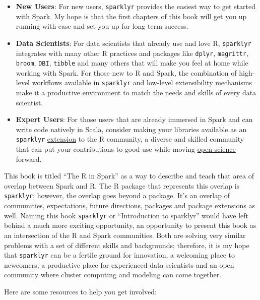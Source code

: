 \documentclass[]{book}
\providecommand{\tightlist}{%
  \setlength{\itemsep}{0pt}\setlength{\parskip}{0pt}}
\theoremstyle{definition}
\theoremstyle{definition}
\theoremstyle{definition}
\theoremstyle{remark}
\begin{document}
\begin{itemize}
\tightlist
\item
  \textbf{New Users}: For new users, \texttt{sparklyr} provides the
  easiest way to get started with Spark. My hope is that the first
  chapters of this book will get you up running with ease and set you up
  for long term success.
\item
  \textbf{Data Scientists}: For data scientists that already use and
  love R, \texttt{sparklyr} integrates with many other R practices and
  packages like \texttt{dplyr}, \texttt{magrittr}, \texttt{broom},
  \texttt{DBI}, \texttt{tibble} and many others that will make you feel
  at home while working with Spark. For those new to R and Spark, the
  combination of high-level workflows available in \texttt{sparklyr} and
  low-level extensibility mechanisms make it a productive environment to
  match the needs and skills of every data scientist.
\item
  \textbf{Expert Users}: For those users that are already immersed in
  Spark and can write code natively in Scala, consider making your
  libraries available as an \texttt{sparklyr}
  \protect\hyperlink{writting-extensions}{extension} to the R community,
  a diverse and skilled community that can put your contributions to
  good use while moving
  \href{https://en.wikipedia.org/wiki/Open_science}{open science}
  forward.
\end{itemize}

This book is titled ``The R in Spark'' as a way to describe and teach
that area of overlap between Spark and R. The R package that represents
this overlap is \texttt{sparklyr}; however, the overlap goes beyond a
package. It's an overlap of communities, expectations, future
directions, packages and package extensions as well. Naming this book
\texttt{sparklyr} or ``Introduction to sparklyr'' would have left behind
a much more exciting opportunity, an opportunity to present this book as
an intersection of the R and Spark communities. Both are solving very
similar problems with a set of different skills and backgrounds;
therefore, it is my hope that \texttt{sparklyr} can be a fertile ground
for innovation, a welcoming place to newcomers, a productive place for
experienced data scientists and an open community where cluster
computing and modeling can come together.

Here are some resources to help you get involved:
\end{document}
